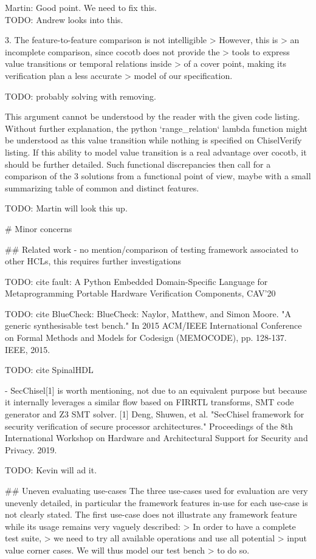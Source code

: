 \documentclass{article}
\newcommand{\todo}[1]{{\color{olive} TODO: #1}}
\newcommand{\martin}[1]{{\color{blue} Martin: #1\\}}
\begin{document}
\martin{Good point. We need to fix this.}
\todo{Andrew looks into this.}

3. The feature-to-feature comparison is not intelligible 
> However, this is
> an incomplete comparison, since cocotb does not provide the
> tools to express value transitions or temporal relations inside
> of a cover point, making its verification plan a less accurate
> model of our specification. 

\todo{probably solving with removing.}

This argument cannot be understood by the reader with the given code listing.
Without further explanation, the python `range\_relation` lambda function might be understood as this value transition while nothing is specified on ChiselVerify listing.
If this ability to model value transition is a real advantage over cocotb, it should be further detailed.
Such functional discrepancies then call for a comparison of the 3 solutions from a functional point of view, maybe with a small summarizing table of common and distinct features.

\todo{Martin will look this up.}

\# Minor concerns

\#\# Related work
- no mention/comparison of testing framework associated to other HCLs, this requires further investigations

\todo{cite fault: A Python Embedded Domain-Specific Language for Metaprogramming Portable Hardware Verification Components, CAV'20}

\todo{cite BlueCheck: BlueCheck: Naylor, Matthew, and Simon Moore. "A generic synthesisable test bench." In 2015 ACM/IEEE International Conference on Formal Methods and Models for Codesign (MEMOCODE), pp. 128-137. IEEE, 2015.}

\todo{cite SpinalHDL}

- SecChisel[1] is worth mentioning, not due to an equivalent purpose but because it internally leverages a similar flow based on FIRRTL transforms, SMT code generator and Z3 SMT solver.
[1] Deng, Shuwen, et al. "SecChisel framework for security verification of secure processor architectures." Proceedings of the 8th International Workshop on Hardware and Architectural Support for Security and Privacy. 2019.

\todo{Kevin will ad it.}

\#\# Uneven evaluating use-cases
The three use-cases used for evaluation are very unevenly detailed, in particular the framework features in-use for each use-case is not clearly stated.
The first use-case does not illustrate any framework feature while its usage remains very vaguely described:
> In order to have a complete test suite,
> we need to try all available operations and use all potential
> input value corner cases. We will thus model our test bench
> to do so.  
\end{document}
